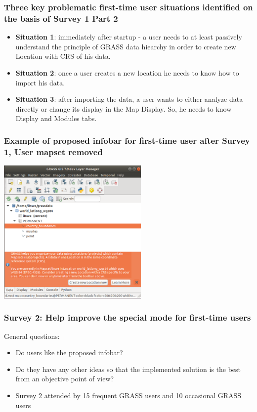 \documentclass[aspectratio=169]{beamer}
\begin{document}
\begin{frame}
\frametitle{Three key problematic first-time user situations identified on the basis of Survey 1 Part 2}

\begin{itemize}
\item{\textbf{Situation 1}: immediately after startup - a user needs to at least passively understand the principle of GRASS data hiearchy in order to create new Location with CRS of his data.}
\vspace{0.5cm}
\item{\textbf{Situation 2}: once a user creates a new location he needs to know how to import his data.}
\vspace{0.5cm}
\item{\textbf{Situation 3}: after importing the data, a user wants to either analyze data directly or change its display in the Map Display. So, he needs to know Display and Modules tabs.}
\end{itemize}
\end{frame}

\begin{frame}
\frametitle{Example of proposed infobar for first-time user after Survey 1, User mapset removed}
	\centering
        \includegraphics[width=0.55\textwidth]{pictures/info1before.PNG}
\end{frame}

\begin{frame}
\frametitle{Survey 2: Help improve the special mode for first-time users}
General questions:
\begin{itemize}
\item Do users like the proposed infobar?
\item Do they have any other ideas so that the implemented solution is the best from an objective point of view?
\vspace{0.4cm}
\item Survey 2 attended by 15 frequent GRASS users and 10 occasional GRASS users
\end{itemize}
\end{frame}
\end{document}
